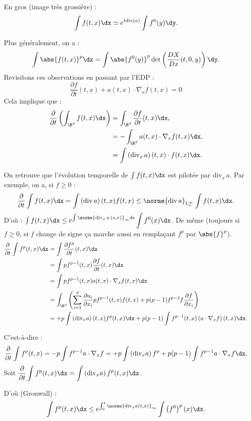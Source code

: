 \documentclass[12pt,a4paper]{article}
\newcommand\diff[2]{\dfrac{\partial #1}{\partial #2}}
\begin{document}
	\begin{rmq}
		En gros (image très grossière) :
		\[
		\int f(t,x) \dx \simeq e^{t\mathrm{div}(a)}\int f^0(y)\dy.
		\]
	\end{rmq}
	
	Plus généralement, on a :
	\[
	\int \abs{f(t,x)}^p\dx = \int \abs{f^0(y)}^p\det\left(\dfrac{DX}{Dx}(t,0,y)\right)\dy.
	\]
	Revisitons ces observations en passant par l'EDP :
	\[
	\diff ft(t,x) + a(t,x) \cdot \nabla_x f(t,x) = 0
	\]
	Cela implique que :
	\[
	\begin{aligned}
		\diff{}t\left(\int_{\R^d} f(t,x)\dx\right) &= \int_{\R^d}\diff ft(t,x) \dx, \\
		&= -\int_{\R^d} a(t,x) \cdot\nabla_x f(t,x) \dx,\\
		&= \int \left(\mathrm{div}_x\, a\right)(t,x) \cdot f(t,x)\dx.
	\end{aligned}
	\]
	
	On retrouve que l'évolution temporelle de $\int f(t,x)\dx$ est pilotée par $\mathrm{div}_x\,a$. Par exemple, on a, si $f \geq 0$ :
	\[
	\diff{}t \int f(t,x) \dx = \int \left(\mathrm{div}\, a\right)(t,x)f(t,x) \leq \norme{\mathrm{div}\, a}_{\mathrm{L}_x^\infty}\int f(t,x)\dx.
	\]
	D'où : $\int f(t,x)\dx \leq e^{\int\norme{\mathrm{div}_x\, a\,(s,x)}_{\infty}\mathrm{ds}}\displaystyle\int f^0(x)\dx$. De même (toujours si $f\geq 0$, si $f$ change de signe ça marche aussi en remplaçant $f^p$ par $\abs{f}^p$).
	\[
	\begin{aligned}
		\diff{}t\int f^p(t,x) \dx &= \int \diff{f^p}{t}(t,x)\dx\\
		&= \int p f^{p-1}(t,x) \diff ft(t,x) \dx\\
		&= \int pf^{p-1}(t,x) a(t,x) \cdot\nabla_xf(t,x) \dx\\
		&= \int_{\R^d}\left(\sum_{i=1}^d \diff{a_i}{x_i}pf^{p-1}(t,x) f(t,x) + p(p-1)f^{p-2}f	\diff f{x_i}\right)\\
		&=+p\int\left(\mathrm{div}_xa\right)(t,x) f^p(t,x)\dx + p(p-1) \int f^{p-1}(t,x) \left(a\cdot\nabla_x f\right)(t,x) \dx.
	\end{aligned}
	\]
	
	
	C'est-à-dire : 
	\[
	\diff{}t \int f^p(t,x) = -p\int f^{p-1} a\cdot\nabla_x f = +p\int\left(\mathrm{div}_x a\right)f^p + p(p-1)\int f^{p-1}a\cdot \nabla_x f\dx.
	\]
	Soit $\diff{}t\displaystyle\int f^p(t,x) \dx = \int\left(\mathrm{div}_x a\right)f^p(t,x) \dx$.
	
	D'où (Gronwall) :
	\begin{equation}
		\int f^p(t,x) \dx \leq e^{\int_0^t \norme{\mathrm{div}_xa(t,x)}_{\infty}}\int\left(f^0\right)^p(x) \dx.
	\end{equation}
	
\end{document}
